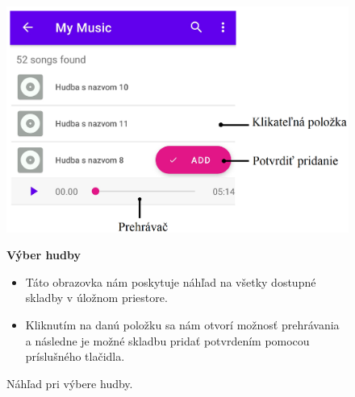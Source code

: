 \documentclass[12pt, oneside]{book}
\begin{document}
\begin{figure}[H]
\begin{minipage}[b]{0.55\linewidth}
  \includegraphics[width=1\textwidth]{images/audio.png}
    \caption{Náhľad pri výbere hudby. }
    \label{fig:obr12}
\end{minipage}
\hspace{0.5cm}
\begin{minipage}[b]{0.4\linewidth}

 \vspace{40pt} 

    \hspace{15pt} \textbf{Výber hudby}

 \begin{itemize}
        \item Táto obrazovka nám poskytuje náhľad na všetky dostupné skladby v úložnom priestore.
        \item Kliknutím na danú položku sa nám otvorí možnosť prehrávania a následne je možné skladbu pridať potvrdením pomocou príslušného tlačidla.
       
    \end{itemize}
    
\end{minipage}
\end{figure}
\end{document}
